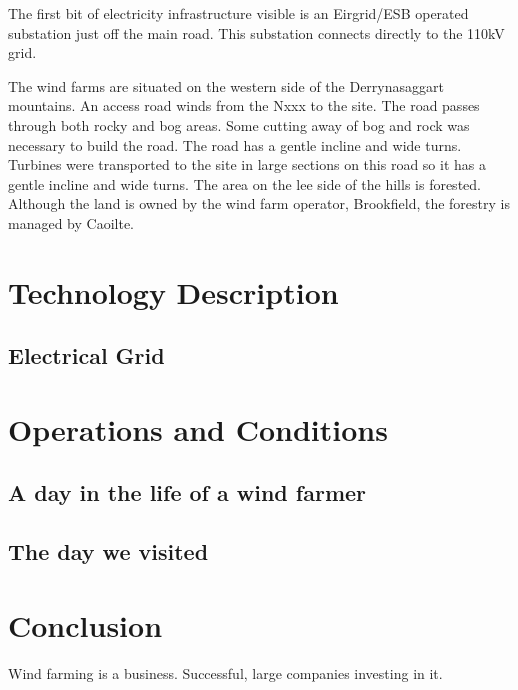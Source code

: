 \documentclass[12pt]{article} %
\begin{document}
The first bit of electricity infrastructure visible is an Eirgrid/ESB operated substation just off the main road. This substation connects directly to the 110kV grid.

The wind farms are situated on the western side of the Derrynasaggart mountains. An access road winds from the Nxxx to the site. The road passes through both rocky and bog areas. Some cutting away of bog and rock was necessary to build the road. The road has a gentle incline and wide turns. Turbines were transported to the site in large sections on this road so it has a gentle incline and wide turns.
The area on the lee side of the hills is forested. Although the land is owned by the wind farm operator, Brookfield, the forestry is managed by Caoilte.





\section{Technology Description}
\subsection{Electrical Grid}


\section{Operations and Conditions}

\subsection{A day in the life of a wind farmer}

\subsection{The day we visited}

\section{Conclusion}
Wind farming is a business.
Successful, large companies investing in it.


\printbibliography

\end{document}
